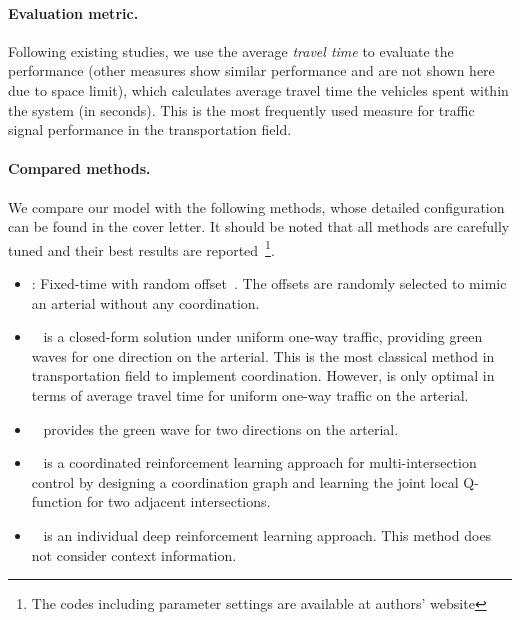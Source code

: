 \paragraph{Evaluation metric.}Following existing studies, we use the average \textit{travel time} to evaluate the performance (other measures show similar performance and are not shown here due to space limit), which calculates average travel time the vehicles spent within the system (in seconds). This is the most frequently used measure for traffic signal performance in the transportation field.

\paragraph{Compared methods.}We compare our model with the following methods, whose detailed configuration can be found in the cover letter. It should be noted that all methods are carefully tuned and their best results are reported~\footnote{The codes including parameter settings are available at authors' website}. 

\begin{itemize}[wide,noitemsep,topsep=0pt]

\item \textbf{\FT}: Fixed-time with random offset~\cite{Roess2011t}. The offsets are randomly selected to mimic an arterial without any coordination.

\item \textbf{\Greenwave}~\cite{Roess2011t} is a closed-form solution under uniform one-way traffic, providing green waves for one direction on the arterial. 
This is the most classical method in transportation field to implement coordination. However, \Greenwave is only optimal in terms of average travel time for uniform one-way traffic on the arterial. 

\item \textbf{\Maxband}~\cite{little1981maxband} provides the green wave for two directions on the arterial. 

\item \textbf{\NIPS}~\cite{VaOl16} is a coordinated reinforcement learning approach for multi-intersection control by designing a coordination graph and learning the joint local Q-function for two adjacent intersections.


\item \textbf{\Deeplight}~\cite{wei2018intellilight} is an individual deep reinforcement learning approach. This method does not consider context information. %

\end{itemize}

